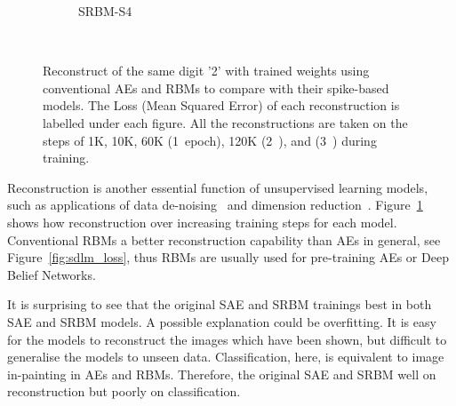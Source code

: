 \begin{figure}
\begin{subfigure}[t]{0.32\textwidth}
		\caption{SRBM-S4}
	\end{subfigure}\\
	\DIFdelbeginFL %
\DIFdelendFL \DIFaddbeginFL \caption[Reconstructions of the same digit '2'.]{\DIFaddendFL Reconstruct of the same digit '2' with trained weights using conventional AEs and RBMs to compare with their spike-based models.
		The Loss (Mean Squared Error) of each reconstruction is labelled under each figure.
		All the reconstructions are taken on the steps of 1K, 10K, 60K (1~epoch), 120K (2~\DIFdelbeginFL {}\DIFdelendFL \DIFaddbeginFL {}\DIFaddendFL ), and \DIFdelbeginFL {}\DIFdelendFL \DIFaddbeginFL {}\DIFaddendFL (3~\DIFdelbeginFL {}\DIFdelendFL \DIFaddbeginFL {}\DIFaddendFL ) during training.}
	\label{fig:sdlm_recon}
\end{figure}

Reconstruction is another essential function of \DIFdelbegin {}\DIFdelend \DIFaddbegin {}\DIFaddend unsupervised learning models, such as applications of data de-noising~\citep{xie2012image} and dimension reduction~\citep{hinton2006fast}.
Figure~\ref{fig:sdlm_recon} shows how reconstruction \DIFdelbegin {}\DIFdelend \DIFaddbegin {}\DIFaddend over increasing training steps for each model.
Conventional RBMs \DIFdelbegin {}\DIFdelend \DIFaddbegin {}\DIFaddend a better reconstruction capability than AEs in general, see Figure~\ref{fig:sdlm_loss}, thus RBMs are usually used for pre-training AEs or Deep Belief Networks.

It is surprising to see that the original SAE and SRBM trainings \DIFdelbegin {}\DIFdelend \DIFaddbegin {}\DIFaddend best in both SAE and SRBM models.
A possible explanation could be overfitting.
It is easy for the models to reconstruct the images which have been shown, but difficult to generalise the models to unseen data.
Classification, here, is equivalent to image in-painting in AEs and RBMs.
Therefore, the original SAE and SRBM \DIFdelbegin {}\DIFdelend \DIFaddbegin {}\DIFaddend well on reconstruction but poorly on classification.
\DIFaddbegin {}

